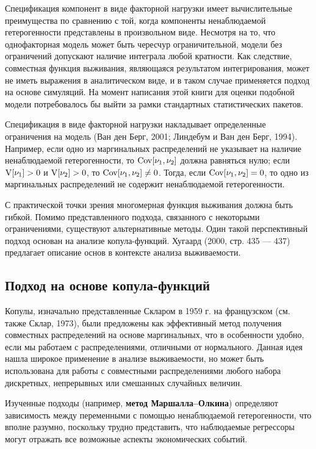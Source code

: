 Спецификация компонент в виде факторной нагрузки имеет вычислительные преимущества по сравнению с той, когда компоненты ненаблюдаемой гетерогенности представлены в произвольном виде. Несмотря на то, что однофакторная модель может быть чересчур ограничительной, модели без ограничений допускают наличие интеграла любой кратности. Как следствие, совместная функция выживания, являющаяся результатом интегрирования, может не иметь выражения в аналитическом виде, и в  таком случае применяется подход на основе симуляций. На момент написания этой книги для оценки подобной модели потребовалось бы выйти за рамки стандартных статистических пакетов.

Спецификация в виде факторной нагрузки накладывает определенные ограничения на модель (Ван ден Берг, 2001; Линдебум и Ван ден Берг, 1994). Например, если одно из маргинальных распределений не указывает на наличие ненаблюдаемой гетерогенности, то $\mathrm{Cov}[\nu_1, \nu_2]$ должна равняться нулю; если $\mathrm{V}[\nu_1] > 0$ и $\mathrm{V}[\nu_2] > 0$, то $\mathrm{Cov}[\nu_1, \nu_2] \ne 0$. Тогда, если $\mathrm{Cov}[\nu_1, \nu_2] = 0$, то одно из маргинальных распределений не содержит ненаблюдаемой гетерогенности.

С практической точки зрения многомерная функция выживания должна быть гибкой. Помимо представленного подхода, связанного с некоторыми ограничениями, существуют альтернативные методы. Один такой перспективный подход основан на анализе копула-функций. Хугаард (2000, стр. 435 --- 437) предлагает описание основ в контексте анализа выживаемости.


\subsection{Подход на основе копула-функций}\label{sec:19.3.3}

\noindent
Копулы, изначально представленные Скларом в 1959 г. на французском (см. также Склар, 1973), были предложены как эффективный метод получения совместных распределений на основе маргинальных, что в особенности удобно, если мы работаем с распределениями, отличными от нормального. Данная идея нашла широкое применение в анализе выживаемости, но может быть использована для работы с совместными распределениями любого набора дискретных, непрерывных или смешанных случайных величин.

Изученные подходы (например, \textbf{метод Маршалла--Олкина}) определяют зависимость между переменными с помощью ненаблюдаемой гетерогенности, что вполне разумно, поскольку трудно представить, что наблюдаемые регрессоры могут отражать все возможные аспекты экономических событий.


